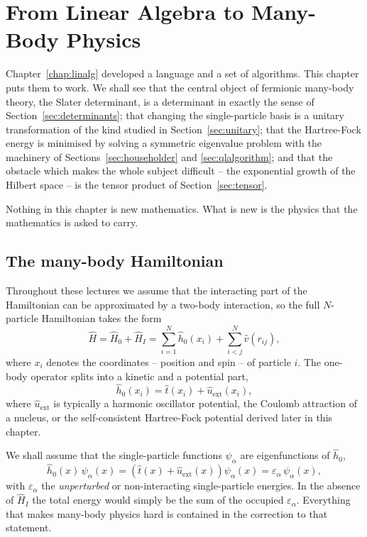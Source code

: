 \chapter{From Linear Algebra to Many-Body Physics}
\label{chap:mbphys}

Chapter~\ref{chap:linalg} developed a language and a set of algorithms.  This
chapter puts them to work.  We shall see that the central object of fermionic
many-body theory, the Slater determinant, is a determinant in exactly the
sense of Section~\ref{sec:determinants}; that changing the single-particle
basis is a unitary transformation of the kind studied in
Section~\ref{sec:unitary}; that the Hartree-Fock energy is minimised by
solving a symmetric eigenvalue problem with the machinery of
Sections~\ref{sec:householder} and \ref{sec:qlalgorithm}; and that the
obstacle which makes the whole subject difficult -- the exponential growth of
the Hilbert space -- is the tensor product of Section~\ref{sec:tensor}.

Nothing in this chapter is new mathematics.  What is new is the physics that
the mathematics is asked to carry.

\section{The many-body Hamiltonian}
\label{sec:hamiltonian}

Throughout these lectures we assume that the interacting part of the
Hamiltonian can be approximated by a two-body interaction, so the full
$N$-particle Hamiltonian takes the form
\begin{equation}
  \hat{H} = \hat{H}_0 + \hat{H}_I
           = \sum_{i=1}^{N}\hat{h}_0(x_i)
           + \sum_{i<j}^{N}\hat{v}(r_{ij}),
  \label{eq:H}
\end{equation}
where $x_i$ denotes the coordinates -- position and spin -- of particle $i$.
The one-body operator splits into a kinetic and a potential part,
\begin{equation}
  \hat{h}_0(x_i) = \hat{t}(x_i) + \hat{u}_{\mathrm{ext}}(x_i),
  \label{eq:2-onebody}
\end{equation}
where $\hat{u}_{\mathrm{ext}}$ is typically a harmonic oscillator potential,
the Coulomb attraction of a nucleus, or the self-consistent Hartree-Fock
potential derived later in this chapter.

We shall assume that the single-particle functions $\psi_{\alpha}$ are
eigenfunctions of $\hat{h}_0$,
\begin{equation}
  \hat{h}_0(x)\,\psi_{\alpha}(x)
   = \left(\hat{t}(x)+\hat{u}_{\mathrm{ext}}(x)\right)\psi_{\alpha}(x)
   = \varepsilon_{\alpha}\,\psi_{\alpha}(x),
  \label{eq:2-spequation}
\end{equation}
with $\varepsilon_{\alpha}$ the \emph{unperturbed} or non-interacting
single-particle energies.  In the absence of $\hat{H}_I$ the total energy
would simply be the sum of the occupied $\varepsilon_{\alpha}$.  Everything
that makes many-body physics hard is contained in the correction to that
statement.

